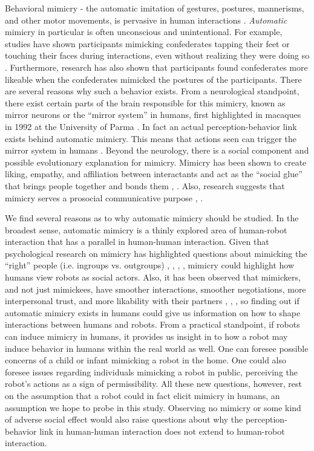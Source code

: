 \documentclass{acm_proc_article-sp}
\begin{document}
Behavioral mimicry - the automatic imitation of gestures, postures, mannerisms, and other motor movements, is pervasive in human interactions \cite{chartrand2013antecedents}. \textit{Automatic} mimicry in particular is often unconscious and unintentional. For example, studies have shown participants mimicking confederates tapping their feet or touching their faces during interactions, even without realizing they were doing so \cite{chartrand1999chameleon}. Furthermore, research has also shown that participants found confederates more likeable when the confederates mimicked the postures of the participants. There are several reasons why such a behavior exists. From a neurological standpoint, there exist certain parts of the brain responsible for this mimicry, known as mirror neurons or the ``mirror system'' in humans, first highlighted in macaques in 1992 at the University of Parma \cite{ehrenfeld2011reflections}. In fact an actual perception-behavior link exists behind automatic mimicry. This means that actions seen can trigger the mirror system in humans \cite{chartrand1999chameleon}. Beyond the neurology, there is a social component and possible evolutionary explanation for mimicry. Mimicry has been shown to create liking, empathy, and affiliation between interactants and act as the ``social glue'' that brings people together and bonds them \cite{chartrand2013antecedents}, \cite{lakin2003chameleon}. Also, research suggests that mimicry serves a prosocial communicative purpose \cite{bavelas1986show}, \cite{chartrand2013antecedents}.

We find several reasons as to why automatic mimicry should be studied. In the broadest sense, automatic mimicry is a thinly explored area of human-robot interaction that has a parallel in human-human interaction. Given that psychological research on mimicry has highlighted questions about mimicking the ``right'' people (i.e. ingroups vs. outgroups) \cite{bourgeois2008impact}, \cite{chartrand2013antecedents}, \cite{kavanagh2011s}, \cite{yabar2006implicit}, mimicry could highlight how humans view robots as social actors. Also, it has been observed that mimickers, and not just mimickees, have smoother interactions, smoother negotiations, more interpersonal trust, and more likability with their partners \cite{maddux2008chameleons}, \cite{stel2010mimicry}, \cite{swaab2011early}, so finding out if automatic mimicry exists in humans could give us information on how to shape interactions between humans and robots. From a practical standpoint, if robots can induce mimicry in humans, it provides us insight in to how a robot may induce behavior in humans within the real world as well. One can foresee possible concerns of a child or infant mimicking a robot in the home. One could also foresee issues regarding individuals mimicking a robot in public, perceiving the robot's actions as a sign of permissibility. All these new questions, however, rest on the assumption that a robot could in fact elicit mimicry in humans, an assumption we hope to probe in this study. Observing no mimicry or some kind of adverse social effect would also raise questions about why the perception-behavior link in human-human interaction does not extend to human-robot interaction.
\end{document}
